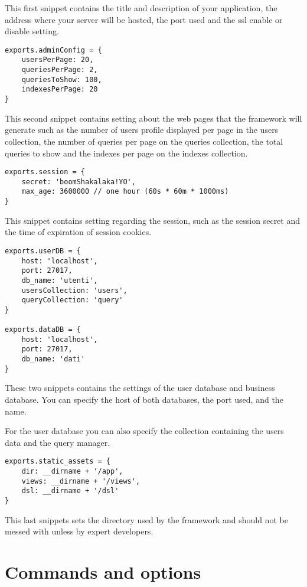 This first snippet contains the title and description of your application, the address where your server will be hosted, the port used and the ssl enable or disable setting.

\begin{verbatim}
exports.adminConfig = {
	usersPerPage: 20,
	queriesPerPage: 2,
	queriesToShow: 100,
	indexesPerPage: 20
}
\end{verbatim}

This second snippet contains setting about the web pages that the framework will generate such as the number of users profile displayed per page in the users collection, the number of queries per page on the queries collection, the total queries to show and the indexes per page on the indexes collection.

\begin{verbatim}
exports.session = {
	secret: 'boomShakalaka!YO',
	max_age: 3600000 // one hour (60s * 60m * 1000ms)
}
\end{verbatim}

This snippet contains setting regarding the session, such as the session secret and the time of expiration of session cookies.

\begin{verbatim}
exports.userDB = {
	host: 'localhost',
	port: 27017,
	db_name: 'utenti',
	usersCollection: 'users',
	queryCollection: 'query'
}

exports.dataDB = {
	host: 'localhost',
	port: 27017,
	db_name: 'dati'
}
\end{verbatim}

These two snippets contains the settings of the user database and business database.
You can specify the host of both databases, the port used, and the name.

For the user database you can also specify the collection containing the users data and the query manager.


\begin{verbatim}
exports.static_assets = {
	dir: __dirname + '/app',
	views: __dirname + '/views',
	dsl: __dirname + '/dsl'
}
\end{verbatim}

This last snippets sets the directory used by the framework and should not be messed with unless by expert developers.


\section{Commands and options}

